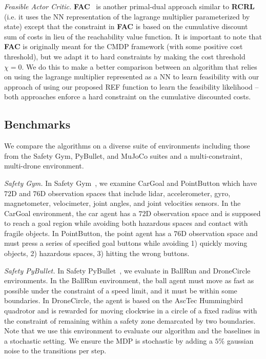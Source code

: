\documentclass{article}
\theoremstyle{definition}
\begin{document}
\emph{Feasible Actor Critic.} \textbf{FAC}~\cite{ma2021feasible} is another primal-dual approach similar to \textbf{RCRL} (i.e. it uses the NN representation of the lagrange multiplier parameterized by state) except that the constraint in \textbf{FAC} is based on the cumulative discount sum of costs in lieu of the reachability value function. It is important to note that \textbf{FAC} is originally meant for the CMDP framework (with some positive cost threshold), but we adapt it to hard constraints by making the cost threshold $\chi=0$. We do this to make a better comparison between an algorithm that relies on using the lagrange multiplier represented as a NN to learn feasibility with our approach of using our proposed REF function to learn the feasibility likelihood -- both approaches enforce a hard constraint on the cumulative discounted costs.

\subsection{Benchmarks}
We compare the algorithms on a diverse suite of environments including those from the Safety Gym, PyBullet, and MuJoCo suites and a multi-constraint, multi-drone environment.

\emph{Safety Gym.} In Safety Gym~\cite{ray2019benchmarking}, we examine CarGoal and PointButton which have $72$D and $76$D observation spaces that include lidar, accelerometer, gyro, magnetometer, velocimeter, joint angles, and joint velocities sensors. In the CarGoal environment, the car agent has a $72$D observation space and is supposed to reach a goal region while avoiding both hazardous spaces and contact with fragile objects. In PointButton, the point agent has a $76$D observation space and must press a series of specified goal buttons while avoiding 1) quickly moving objects, 2) hazardous spaces, 3) hitting the wrong buttons.

\emph{Safety PyBullet.} In Safety PyBullet~\cite{gronauer2022bullet}, we evaluate in BallRun and DroneCircle environments. In the BallRun environment, the ball agent must move as fast as possible under the constraint of a speed limit, and it must be within some boundaries. In DroneCircle, the agent is based on the AscTec Hummingbird quadrotor and is rewarded for moving clockwise in a circle of a fixed radius with the constraint of remaining within a safety zone demarcated by two boundaries. Note that we use this environment to evaluate our algorithm and the baselines in a stochastic setting. We ensure the MDP is stochastic by adding a $5\%$ gaussian noise to the transitions per step. 
\end{document}
